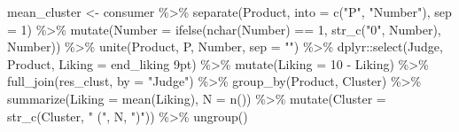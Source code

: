 \documentclass[
]{krantz}
\makeatletter
\newenvironment{Shaded}{\begin{snugshade}}{\end{snugshade}}
\newcommand{\AttributeTok}[1]{\textcolor[rgb]{0.61,0.61,0.61}{#1}}
\newcommand{\DecValTok}[1]{\textcolor[rgb]{0.06,0.06,0.06}{#1}}
\newcommand{\FunctionTok}[1]{\textcolor[rgb]{0,0,0}{#1}}
\newcommand{\NormalTok}[1]{#1}
\newcommand{\OtherTok}[1]{\textcolor[rgb]{0.37,0.37,0.37}{#1}}
\newcommand{\SpecialCharTok}[1]{\textcolor[rgb]{0,0,0}{#1}}
\newcommand{\StringTok}[1]{\textcolor[rgb]{0.5,0.5,0.5}{#1}}
\newenvironment{kframe}{%
\medskip{}
\setlength{\fboxsep}{.8em}
 \def\at@end@of@kframe{}%
 \ifinner\ifhmode%
  \def\at@end@of@kframe{\end{minipage}}%
  \begin{minipage}{\columnwidth}%
 \fi\fi%
 \def\FrameCommand##1{\hskip\@totalleftmargin \hskip-\fboxsep
 \colorbox{shadecolor}{##1}\hskip-\fboxsep
     \hskip-\linewidth \hskip-\@totalleftmargin \hskip\columnwidth}%
 \MakeFramed {\advance\hsize-\width
   \@totalleftmargin\z@ \linewidth\hsize
   \@setminipage}}%
 {\par\unskip\endMakeFramed%
 \at@end@of@kframe}
\renewenvironment{Shaded}{\begin{kframe}}{\end{kframe}}
\makeatother
\begin{document}
\begin{Shaded}
\begin{Highlighting}[]
\NormalTok{mean\_cluster }\OtherTok{\textless{}{-}}\NormalTok{ consumer }\SpecialCharTok{\%\textgreater{}\%}
  \FunctionTok{separate}\NormalTok{(Product, }\AttributeTok{into =} \FunctionTok{c}\NormalTok{(}\StringTok{"P"}\NormalTok{, }\StringTok{"Number"}\NormalTok{), }\AttributeTok{sep =} \DecValTok{1}\NormalTok{) }\SpecialCharTok{\%\textgreater{}\%}
  \FunctionTok{mutate}\NormalTok{(}\AttributeTok{Number =} \FunctionTok{ifelse}\NormalTok{(}\FunctionTok{nchar}\NormalTok{(Number) }\SpecialCharTok{==} \DecValTok{1}\NormalTok{, }
                         \FunctionTok{str\_c}\NormalTok{(}\StringTok{"0"}\NormalTok{, Number), Number)) }\SpecialCharTok{\%\textgreater{}\%}
  \FunctionTok{unite}\NormalTok{(Product, P, Number, }\AttributeTok{sep =} \StringTok{""}\NormalTok{) }\SpecialCharTok{\%\textgreater{}\%}
\NormalTok{  dplyr}\SpecialCharTok{::}\FunctionTok{select}\NormalTok{(Judge, Product, }\AttributeTok{Liking =} \StringTok{\textasciigrave{}}\AttributeTok{end\_liking 9pt}\StringTok{\textasciigrave{}}\NormalTok{) }\SpecialCharTok{\%\textgreater{}\%}
  \FunctionTok{mutate}\NormalTok{(}\AttributeTok{Liking =} \DecValTok{10} \SpecialCharTok{{-}}\NormalTok{ Liking) }\SpecialCharTok{\%\textgreater{}\%}
  \FunctionTok{full\_join}\NormalTok{(res\_clust, }\AttributeTok{by =} \StringTok{"Judge"}\NormalTok{) }\SpecialCharTok{\%\textgreater{}\%}
  \FunctionTok{group\_by}\NormalTok{(Product, Cluster) }\SpecialCharTok{\%\textgreater{}\%}
  \FunctionTok{summarize}\NormalTok{(}\AttributeTok{Liking =} \FunctionTok{mean}\NormalTok{(Liking), }\AttributeTok{N =} \FunctionTok{n}\NormalTok{()) }\SpecialCharTok{\%\textgreater{}\%}
  \FunctionTok{mutate}\NormalTok{(}\AttributeTok{Cluster =} \FunctionTok{str\_c}\NormalTok{(Cluster, }\StringTok{" ("}\NormalTok{, N, }\StringTok{")"}\NormalTok{)) }\SpecialCharTok{\%\textgreater{}\%}
  \FunctionTok{ungroup}\NormalTok{()}


\end{Highlighting}
\end{Shaded}
\end{document}
